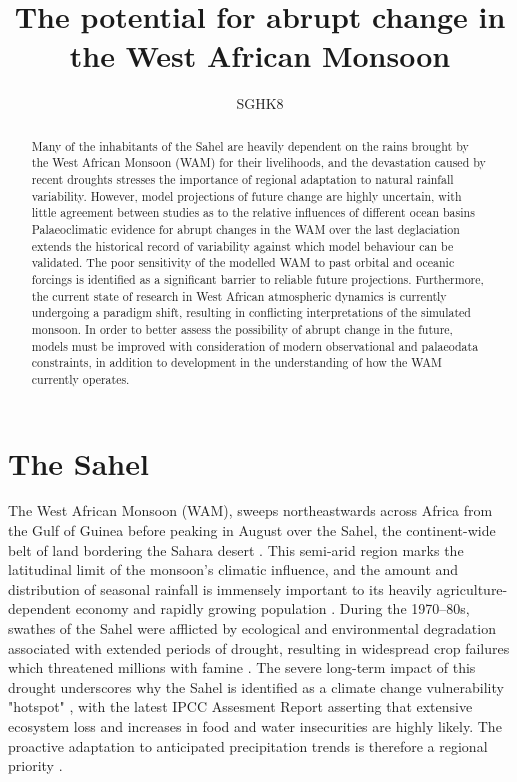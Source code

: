 \documentclass[a4paper]{article}
\begin{document}
\begin{titlepage}
    \title{The potential for abrupt change in the West African Monsoon}
    \author{SGHK8}
    \maketitle

    \begin{abstract}
        Many of the inhabitants of the Sahel are heavily dependent on the rains brought by the West African Monsoon (WAM) for their livelihoods, and the devastation caused by recent droughts stresses the importance of regional adaptation to natural rainfall variability.
        However, model projections of future change are highly uncertain, with little agreement between studies as to the relative influences of different ocean basins 
        Palaeoclimatic evidence for abrupt changes in the WAM over the last deglaciation extends the historical record of variability against which model behaviour can be validated.
        The poor sensitivity of the modelled WAM to past orbital and oceanic forcings is identified as a significant barrier to reliable future projections.
        Furthermore, the current state of research in West African atmospheric dynamics is currently undergoing a paradigm shift, resulting in conflicting interpretations of the simulated monsoon.
        In order to better assess the possibility of abrupt change in the future, models must be improved with consideration of modern observational and palaeodata constraints, in addition to development in the understanding of how the WAM currently operates. 
    \end{abstract}
\end{titlepage}

\section*{The Sahel}
\label{sec:sahelwam}
The West African Monsoon (WAM), sweeps northeastwards across Africa from the Gulf of Guinea before peaking in August over the Sahel, the continent-wide belt of land bordering the Sahara desert \parencite{sultan2003west2, nicholson2013west}.
This semi-arid region marks the latitudinal limit of the monsoon's climatic influence, and the amount and distribution of seasonal rainfall is immensely important to its heavily agriculture-dependent economy and rapidly growing population \parencite{sissoko2011agriculture}.
During the 1970--80s, swathes of the Sahel were afflicted by ecological and environmental degradation associated with extended periods of drought, resulting in widespread crop failures which threatened millions with famine \parencite{benson1998impact, olsson1993causes, walther2016review}.
The severe long-term impact of this drought underscores why the Sahel is identified as a climate change vulnerability "hotspot" \parencite{diffenbaugh2012climate}, with the latest IPCC Assesment Report \parencite{ipcc2014impacts} asserting that extensive ecosystem loss and increases in food and water insecurities are highly likely.
The proactive adaptation to anticipated precipitation trends is therefore a regional priority \parencite{lobell2008prioritizing, sarr2012present}.
\end{document}
